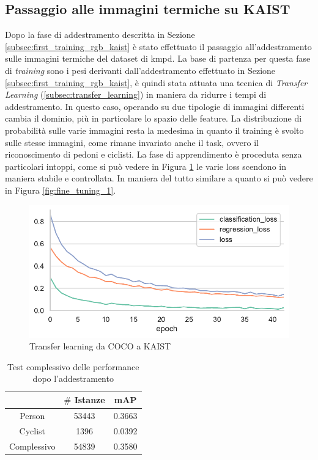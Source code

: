 \subsection{Passaggio alle immagini termiche su KAIST}
Dopo la fase di addestramento descritta in Sezione \ref{subsec:first_training_rgb_kaist} è stato effettuato il passaggio all'addestramento sulle immagini termiche del dataset di \ac{kmpd}. La base di partenza per questa fase di \textit{training} sono i pesi derivanti dall'addestramento effettuato in Sezione \ref{subsec:first_training_rgb_kaist}, è quindi stata attuata una tecnica di \textit{Transfer Learning} (\ref{subsec:transfer_learning}) in maniera da ridurre i tempi di addestramento. In questo caso, operando su due tipologie di immagini differenti cambia il dominio, più in particolare lo spazio delle feature. La distribuzione di probabilità sulle varie immagini resta la medesima in quanto il training è svolto sulle stesse immagini, come rimane invariato anche il task, ovvero il riconoscimento di pedoni e ciclisti.
La fase di apprendimento è proceduta senza particolari intoppi, come si può vedere in Figura \ref{fig:fine_tuning_2} le varie loss scendono in maniera stabile e controllata. In maniera del tutto similare a quanto si può vedere in Figura \ref{fig:fine_tuning_1}.
\begin{figure}[]
    \centering
    \includegraphics[width=\textwidth]{images/graphic/ruby-yogurt-lwir.pdf}
    \caption{Transfer learning da COCO a KAIST}
    \label{fig:fine_tuning_2}
\end{figure} 
\begin{table}[]
    \centering
    \begin{tabular}{|c|c|c|}
    \hline
                & $\#$ Istanze & mAP    \\ \hline
    Person      & 53443             & 0.3663 \\ \hline
    Cyclist     & 1396              & 0.0392 \\ \hline
    Complessivo & 54839             & 0.3580 \\ \hline
    \end{tabular}
    \caption{Test complessivo delle performance dopo l'addestramento}
    \label{table:first_test_lwir_kaist}
\end{table}

